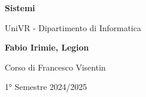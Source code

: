 \begin{titlepage}
	\begin{center}
		\vspace*{1cm}

		\Huge
		\textbf{Sistemi}

		\vspace{0.5cm}
		\LARGE
		UniVR - Dipartimento di Informatica

		\vspace{1.5cm}

		\textbf{Fabio Irimie, Legion}

		\vfill


		\vspace{0.8cm}

    Corso di Francesco Visentin

		1° Semestre 2024/2025

	\end{center}
\end{titlepage}
